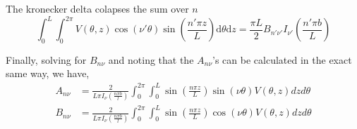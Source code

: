 \documentclass[10pt,a4paper]{article}
\begin{document}
The kronecker delta colapses the sum over $n$
\begin{equation}
\int_0^L\int_0^{2\pi}V(\theta,z)\cos(\nu'\theta)\sin\left(\frac{n'\pi z}{L}\right)\mathrm{d}\theta \mathrm{d}z =
\frac{\pi L}{2} B_{n' \nu'}I_{\nu'}\left(\frac{n'\pi b}{L}\right)
\end{equation}

Finally, solving for $B_{n \nu}$ and noting that the $A_{n \nu}$'s can be calculated in the exact same way, we have,
\begin{subequations}
\begin{align}
A_{n\nu}&=\frac{2}{L\pi I_\nu \left(\frac{n\pi b}{l}\right)}\int_0^{2\pi}\int_0^L
\sin\left(\frac{n \pi z}{L}\right)\sin(\nu \theta) V(\theta, z) dz d\theta \\
B_{n\nu}&=\frac{2}{L\pi I_\nu \left(\frac{n\pi b}{l}\right)}\int_0^{2\pi}\int_0^L
\sin\left(\frac{n \pi z}{L}\right)\cos(\nu \theta) V(\theta, z) dz d\theta
\end{align}
\end{subequations}
\end{document}
